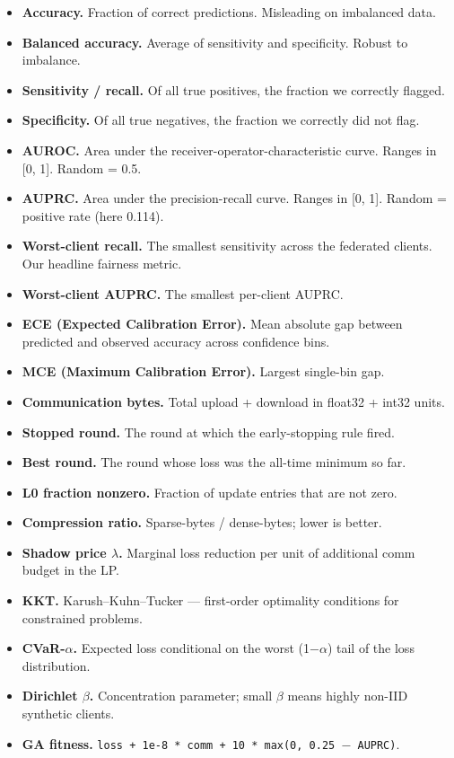 \documentclass{article}
\begin{document}
\begin{itemize}[leftmargin=1.4em,itemsep=2pt,topsep=2pt]
  \item \textbf{Accuracy.} Fraction of correct predictions. Misleading on imbalanced data.
  \item \textbf{Balanced accuracy.} Average of sensitivity and specificity. Robust to imbalance.
  \item \textbf{Sensitivity / recall.} Of all true positives, the fraction we correctly flagged.
  \item \textbf{Specificity.} Of all true negatives, the fraction we correctly did not flag.
  \item \textbf{AUROC.} Area under the receiver-operator-characteristic curve. Ranges in [0, 1]. Random = 0.5.
  \item \textbf{AUPRC.} Area under the precision-recall curve. Ranges in [0, 1]. Random = positive rate (here 0.114).
  \item \textbf{Worst-client recall.} The smallest sensitivity across the federated clients. Our headline fairness metric.
  \item \textbf{Worst-client AUPRC.} The smallest per-client AUPRC.
  \item \textbf{ECE (Expected Calibration Error).} Mean absolute gap between predicted and observed accuracy across confidence bins.
  \item \textbf{MCE (Maximum Calibration Error).} Largest single-bin gap.
  \item \textbf{Communication bytes.} Total upload + download in float32 + int32 units.
  \item \textbf{Stopped round.} The round at which the early-stopping rule fired.
  \item \textbf{Best round.} The round whose loss was the all-time minimum so far.
  \item \textbf{L0 fraction nonzero.} Fraction of update entries that are not zero.
  \item \textbf{Compression ratio.} Sparse-bytes / dense-bytes; lower is better.
  \item \textbf{Shadow price \ensuremath{\lambda}.} Marginal loss reduction per unit of additional comm budget in the LP.
  \item \textbf{KKT.} Karush--Kuhn--Tucker --- first-order optimality conditions for constrained problems.
  \item \textbf{CVaR-\ensuremath{\alpha}.} Expected loss conditional on the worst (1\ensuremath{-}\ensuremath{\alpha}) tail of the loss distribution.
  \item \textbf{Dirichlet \ensuremath{\beta}.} Concentration parameter; small \ensuremath{\beta} means highly non-IID synthetic clients.
  \item \textbf{GA fitness.} \texttt{loss + 1e-8 * comm + 10 * max(0, 0.25 \ensuremath{-} AUPRC)}.
\end{itemize}
\end{document}
